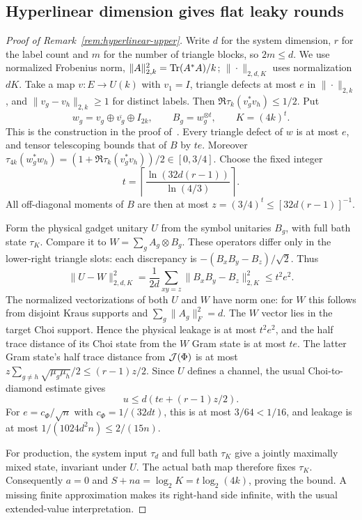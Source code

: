 \subsection{Hyperlinear dimension gives flat leaky rounds}\label{app:hyperlinear-upper}

\begin{proof}[Proof of Remark~\ref{rem:hyperlinear-upper}]
Write $d$ for the system dimension, $r$ for the label count and $m$
for the number of triangle blocks, so $2m\leq d$. We use normalized
Frobenius norm, $\|A\|_{2,k}^2=\operatorname{Tr}(A^*A)/k$;
$\|\cdot\|_{2,d,K}$ uses normalization $dK$. Take a map
$v:E\to U(k)$ with $v_1=I$, triangle defects at most $e$ in
$\|\cdot\|_{2,k}$, and $\|v_g-v_h\|_{2,k}\geq1$ for distinct labels.
Then $\Re\tau_k(v_g^*v_h)\leq1/2$. Put
\[
 w_g=v_g\oplus\overline{v_g}\oplus I_{2k},\qquad
 B_g=w_g^{\otimes t},\qquad K=(4k)^t.
\]
This is the construction in the proof of~\cite[Lemma~2.6]{SlofstraVidick2018}.
Every triangle defect of $w$ is at most $e$, and tensor telescoping
bounds that of $B$ by $te$. Moreover
$\tau_{4k}(w_g^*w_h)=(1+\Re\tau_k(v_g^*v_h))/2\in[0,3/4]$.
Choose the fixed integer
\[
 t=\left\lceil\frac{\ln(32d(r-1))}{\ln(4/3)}\right\rceil.
\]
All off-diagonal moments of $B$ are then at most
$z=(3/4)^t\leq[32d(r-1)]^{-1}$.

Form the physical gadget unitary $U$ from the symbol unitaries $B_g$,
with full bath state $\tau_K$. Compare it to
$W=\sum_g A_g\otimes B_g$. These operators differ only in the
lower-right triangle slots: each discrepancy is
$-(B_xB_y-B_z)/\sqrt2$. Thus
\[
 \|U-W\|_{2,d,K}^2
 =\frac1{2d}\sum_{xy=z}\|B_xB_y-B_z\|_{2,K}^2
 \leq t^2e^2.
\]
The normalized vectorizations of both $U$ and $W$ have norm one:
for $W$ this follows from disjoint Kraus supports and
$\sum_g\|A_g\|_F^2=d$. The $W$ vector lies in the target Choi
support. Hence the physical leakage is at most $t^2e^2$, and the
half trace distance of its Choi state from the $W$ Gram state is
at most $te$. The latter Gram state's half trace distance from
$\mathcal J(\Phi)$ is at most
$z\sum_{g\ne h}\sqrt{\mu_g\mu_h}/2\leq(r-1)z/2$.
Since $U$ defines a channel, the usual Choi-to-diamond estimate gives
\[
 u\leq d\left(te+(r-1)z/2\right).
\]
For $e=c_\Phi/\sqrt n$ with $c_\Phi=1/(32dt)$, this is at most
$3/64<1/16$, and leakage is at most
$1/(1024d^2n)\leq2/(15n)$.

For production, the system input $\tau_d$ and full bath $\tau_K$
give a jointly maximally mixed state, invariant under $U$. The actual
bath map therefore fixes $\tau_K$. Consequently $a=0$ and
$S+na=\log_2K=t\log_2(4k)$, proving the bound. A missing finite
approximation makes its right-hand side infinite, with the usual
extended-value interpretation.


\end{proof}
